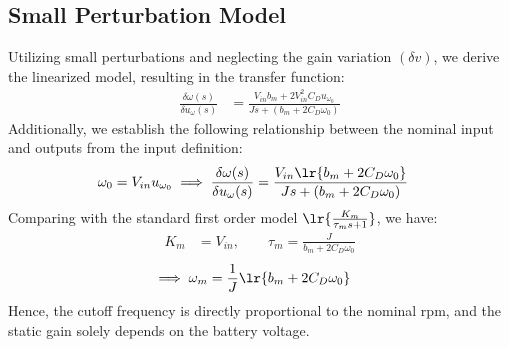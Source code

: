 \subsection{Small Perturbation Model}
Utilizing small perturbations and neglecting the gain variation $(\delta v)$, we derive the linearized model, resulting in the transfer function:
\begin{align}
    \frac{\delta \omega(s)}{\delta u_\omega (s)} &= \frac{V_{in} b_m + 2V_{in}^2 C_D u_{\omega_0}}{Js + (b_m + 2 C_D \omega_0)}
\end{align}
Additionally, we establish the following relationship between the nominal input and outputs from the input definition:
\begin{align}
    \omega_0 &= V_{in} u_{\omega_0}
    \implies \frac{\delta \omega(s)}{\delta u_\omega (s)} =\frac{V_{in} \lr{b_m + 2C_D \omega_0}}{Js + (b_m + 2 C_D \omega_0)}
\end{align}
Comparing with the standard first order model $\lr{\frac{K_m}{\tau_m s + 1}}$,
we have:
\begin{align}
    K_m &= V_{in}, \qquad
    \tau_m = \frac{J}{b_m + 2 C_D \omega_0}
\end{align}
\begin{align}
    \implies \omega_m &= \frac{1}{J}\lr{b_m + 2 C_D \omega_0}
\end{align}
Hence, the cutoff frequency is directly proportional to the nominal rpm, and the
static gain solely depends on the battery voltage.
